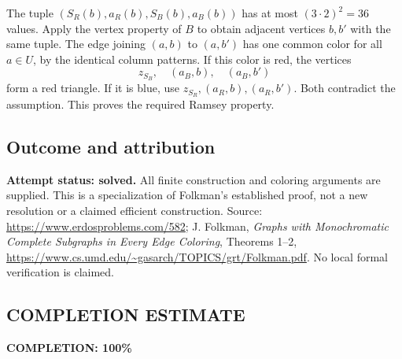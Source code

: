 The tuple $(S_R(b),a_R(b),S_B(b),a_B(b))$ has at most $(3\cdot2)^2=36$ values. Apply the vertex property of $B$ to obtain adjacent vertices $b,b'$ with the same tuple. The edge joining $(a,b)$ to $(a,b')$ has one common color for all $a\in U$, by the identical column patterns. If this color is red, the vertices
\[z_{S_B},\quad(a_B,b),\quad(a_B,b')\]
form a red triangle. If it is blue, use $z_{S_R},(a_R,b),(a_R,b')$. Both contradict the assumption. This proves the required Ramsey property.

\subsection*{Outcome and attribution}
\textbf{Attempt status: solved.} All finite construction and coloring arguments are supplied. This is a specialization of Folkman's established proof, not a new resolution or a claimed efficient construction. Source: \url{https://www.erdosproblems.com/582}; J. Folkman, \emph{Graphs with Monochromatic Complete Subgraphs in Every Edge Coloring}, Theorems 1--2, \url{https://www.cs.umd.edu/~gasarch/TOPICS/grt/Folkman.pdf}. No local formal verification is claimed.

\subsection*{COMPLETION ESTIMATE}
\textbf{COMPLETION: 100\%}
